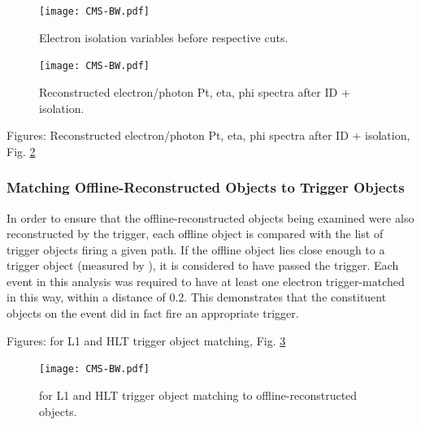  \begin{figure}[htb]
  \begin{center}
    \texttt{[image: CMS-BW.pdf]}
  \end{center}
  \caption[Electron isolation variables before respective cuts]{Electron isolation variables before respective cuts.}
  \label{fig:ElecIsoVars}
 \end{figure}



 \begin{figure}[htb]
  \begin{center}
    \texttt{[image: CMS-BW.pdf]}
  \end{center}
  \caption[Reconstructed electron/photon Pt, eta, phi spectra after ID + isolation]{Reconstructed electron/photon Pt, eta, phi spectra after ID + isolation.}
  \label{fig:RecoSpectraAfterEidEiso}
 \end{figure}

Figures: Reconstructed electron/photon Pt, eta, phi spectra after ID + isolation, Fig. \ref{fig:RecoSpectraAfterEidEiso}


\subsubsection{Matching Offline-Reconstructed Objects to Trigger Objects}
In order to ensure that the offline-reconstructed objects being examined were also reconstructed by the trigger, 
each offline object is compared with the list of trigger objects firing a given path.  
If the offline object lies close enough to a trigger object (measured by \DR), 
it is considered to have passed the trigger.  
Each event in this analysis was required to have at least one electron trigger-matched in this way, 
within a \DR distance of 0.2.  
This demonstrates that the constituent objects on the event did in fact fire an appropriate trigger.  

Figures: \DR for L1 and HLT trigger object matching, Fig. \ref{fig:TriggerObjectSelectionDeltaR}

 \begin{figure}[htb]
  \begin{center}
    \texttt{[image: CMS-BW.pdf]}
  \end{center}
  \caption[\DR for L1 and HLT trigger object matching to offline for electron selection]{\DR for L1 and HLT trigger object matching to offline-reconstructed objects.}
  \label{fig:TriggerObjectSelectionDeltaR}
 \end{figure}



